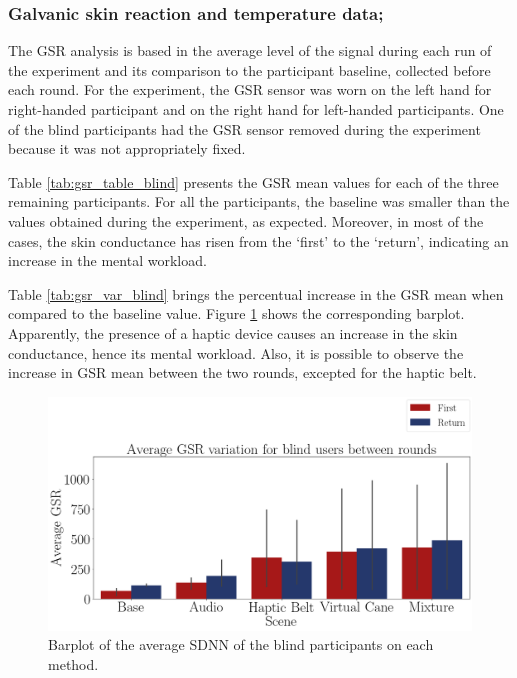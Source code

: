 \subsubsection{Galvanic skin reaction and temperature data;}
\label{subsubsec:results_gsr_temp_1}

The GSR analysis is based in the average level of the signal during each run of the experiment and its comparison to the participant baseline, collected before each round. For the experiment, the GSR sensor was worn on the left hand for right-handed participant and on the right hand for left-handed participants. One of the blind participants had the GSR sensor removed during the experiment because it was not appropriately fixed.

Table \ref{tab:gsr_table_blind} presents the GSR mean values for each of the three remaining participants. For all the participants, the baseline was smaller than the values obtained during the experiment, as expected. Moreover, in most of the cases, the skin conductance has risen from the ‘first’ to the ‘return’, indicating an increase in the mental workload.



Table \ref{tab:gsr_var_blind} brings the percentual increase in the GSR mean when compared to the baseline value. Figure \ref{fig:barplot_gsr_avg_5_scene_blind} shows the corresponding barplot. Apparently, the presence of a haptic device causes an increase in the skin conductance, hence its mental workload. Also, it is possible to observe the increase in GSR mean between the two rounds, excepted for the haptic belt.



\begin{figure}[!htb]
    \centering
    \includegraphics[width = 0.8\linewidth]{Resultados/GSR/Figuras/png/barplot_gsr_avg_5_scene_blind.png}
    \caption{Barplot of the average SDNN of the blind participants on each method.}
    \label{fig:barplot_gsr_avg_5_scene_blind}
\end{figure}

